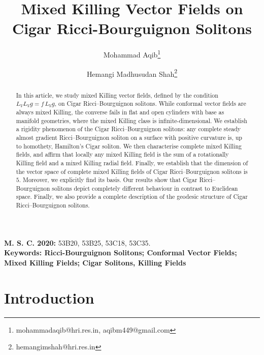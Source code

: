 \documentclass{article}
\author[1,2]{Mohammad Aqib\thanks{mohammadaqib@hri.res.in, aqibm449@gmail.com}}
\author[1,2]{Hemangi Madhusudan Shah\thanks{hemangimshah@hri.res.in}}
\affil[1]{Harish-Chandra Research Institute, Chhatnag Road, Jhunsi, Prayagraj-211019, India}
\affil[2]{Homi Bhabha National Institute, Training School Complex, Anushakti Nagar, Mumbai 400094, India}
\theoremstyle{definition}
\theoremstyle{remark}
\begin{document}
\title{Mixed Killing Vector Fields on Cigar Ricci-Bourguignon Solitons}
\date{}
\maketitle
\begin{abstract}
In this article, we study mixed Killing vector fields, defined by the condition 
$L_V L_V g = f\, L_V g$, on Cigar Ricci--Bourguignon solitons. 
While conformal vector fields are always mixed Killing, the converse fails in flat and open cylinders with base as manifold geometries, where the mixed Killing class is 
infinite-dimensional.  We establish a rigidity phenomenon of the Cigar Ricci--Bourguignon solitons: any complete steady almost gradient  Ricci--Bourguignon soliton on a surface with positive curvature is, up to homothety, Hamilton’s Cigar soliton. 
We then characterise complete mixed Killing fields, and affirm that locally any mixed Killing field is the sum of a rotationally Killing field and a mixed Killing radial field. Finally, we establish that the dimension of the vector space of complete mixed Killing fields of Cigar Ricci--Bourguignon solitons
is $5$. Moreover, we explicitly find its basis.
Our results show that Cigar Ricci--Bourguignon solitons depict 
completely different behaviour in contrast to Euclidean space.
Finally,  we also 
provide a complete description of the geodesic structure 
of  Cigar Ricci--Bourguignon solitons. 
\end{abstract}

\textbf {M. S. C. 2020:} 53B20, 53B25, 53C18, 53C35.\\
	
	\noindent
	\textbf{Keywords:  Ricci-Bourguignon Solitons; Conformal Vector Fields;  Mixed Killing Fields; Cigar Solitons, Killing Fields}

\section{Introduction}
\end{document}

